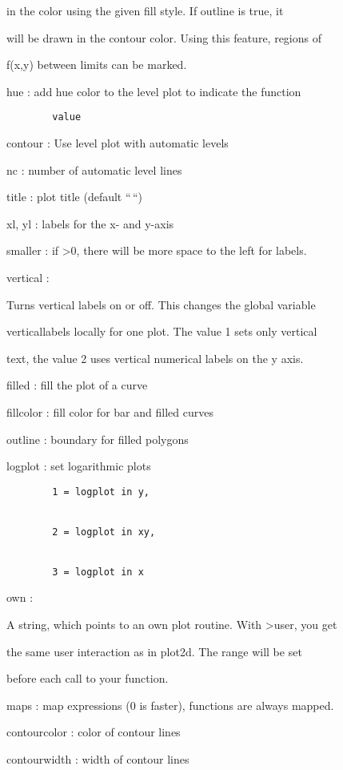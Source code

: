 \documentclass[
]{book}
\begin{document}
in the color using the given fill style. If outline is true, it

will be drawn in the contour color. Using this feature, regions of

f(x,y) between limits can be marked.

hue : add hue color to the level plot to indicate the function

\begin{verbatim}
        value
\end{verbatim}

contour : Use level plot with automatic levels

nc : number of automatic level lines

title : plot title (default ``\,``)

xl, yl : labels for the x- and y-axis

smaller : if \textgreater0, there will be more space to the left for labels.

vertical :

Turns vertical labels on or off. This changes the global variable

verticallabels locally for one plot. The value 1 sets only vertical

text, the value 2 uses vertical numerical labels on the y axis.

filled : fill the plot of a curve

fillcolor : fill color for bar and filled curves

outline : boundary for filled polygons

logplot : set logarithmic plots

\begin{verbatim}
        1 = logplot in y,


        2 = logplot in xy,


        3 = logplot in x
\end{verbatim}

own :

A string, which points to an own plot routine. With \textgreater user, you get

the same user interaction as in plot2d. The range will be set

before each call to your function.

maps : map expressions (0 is faster), functions are always mapped.

contourcolor : color of contour lines

contourwidth : width of contour lines
\end{document}
